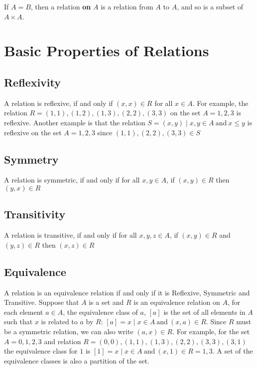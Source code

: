 If $A = B$, then a relation \textbf{on} $A$ is a relation from $A$ to $A$, and so is a subset of $A \times A$.

\section*{Basic Properties of Relations}

\subsection*{Reflexivity}

A relation is reflexive, if and only if $(x, x) \in R$ for all $x \in A$. For example, the relation
 $R = {(1, 1), (1, 2), (1, 3), (2, 2), (3, 3)}$ on the set $A = {1, 2, 3}$ is reflexive. Another example is that the
 relation $S = {(x, y) \mid x, y \in A \mathrm{\ and\ } x \leq y}$ is reflexive on the set $A = {1, 2, 3}$ since
 $(1, 1), (2, 2), (3, 3) \in S$

\subsection*{Symmetry}

A relation is symmetric, if and only if for all $x, y \in A$, if $(x, y) \in R$ then $(y, x) \in R$

\subsection*{Transitivity}

A relation is transitive, if and only if for all $x, y, z \in A$, if $(x, y) \in R$ and $(y, z) \in R$ then
 $(x, z) \in R$

\subsection*{Equivalence}

A relation is an equivalence relation if and only if it is Reflexive, Symmetric and Transitive. Suppose that $A$ is a
 set and $R$ is an equivalence relation on $A$, for each element $a \in A$, the equivalence class of $a$, $[a]$ is the
 set of all elements in $A$ such that $x$ is related to $a$ by $R$: $[a] = {x \mid x \in A \mathrm{\ and\ } (x, a) \in R}$.
 Since $R$ must be a symmetric relation, we can also write $(a, x) \in R$. For example, for the set $A = {0, 1, 2, 3}$
 and relation $R = {(0, 0), (1, 1), (1, 3), (2, 2), (3, 3), (3, 1)}$ the equivalence class for $1$ is
 $[1] = {x \mid x \in A \mathrm{\ and\ } (x, 1) \in R} = {1, 3}$. A set of the equivalence classes is also a partition
 of the set.